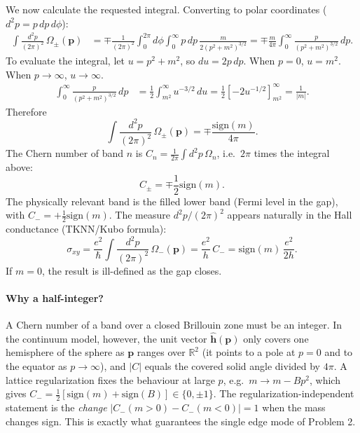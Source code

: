 \documentclass{article}
\begin{document}
    We now calculate the requested integral. Converting to polar coordinates ($d^2p = p \,dp \,d\phi$):
    \begin{align}
        \int \frac{d^2p}{(2\pi)^2}\, \Omega_\pm(\mathbf{p}) &= \mp\frac{1}{(2\pi)^2}\int_0^{2\pi} d\phi \int_0^{\infty} p \,dp \, \frac{m}{2(p^2 + m^2)^{3/2}}
        = \mp\frac{m}{4\pi} \int_0^{\infty} \frac{p}{(p^2 + m^2)^{3/2}} \,dp.
    \end{align}
    To evaluate the integral, let $u = p^2 + m^2$, so $du = 2p \,dp$. When $p=0$, $u=m^2$. When $p\to\infty$, $u\to\infty$.
    \begin{align}
        \int_0^{\infty} \frac{p}{(p^2 + m^2)^{3/2}} \,dp &= \frac{1}{2} \int_{m^2}^{\infty} u^{-3/2} \,du
        = \frac{1}{2} \left[ -2u^{-1/2} \right]_{m^2}^{\infty} = \frac{1}{|m|}.
    \end{align}
    Therefore
    \begin{equation}
        \int \frac{d^2p}{(2\pi)^2}\, \Omega_\pm(\mathbf{p}) = \mp\frac{\mathrm{sign}(m)}{4\pi}.
    \end{equation}
    The Chern number of band $n$ is $C_n = \frac{1}{2\pi}\int d^2p\, \Omega_n$, i.e.\ $2\pi$ times the integral above:
    \begin{equation}
        C_\pm = \mp\frac{1}{2}\mathrm{sign}(m).
    \end{equation}
    The physically relevant band is the filled lower band (Fermi level in the gap), with $C_- = +\frac{1}{2}\mathrm{sign}(m)$. The measure $d^2p/(2\pi)^2$ appears naturally in the Hall conductance (TKNN/Kubo formula):
    \begin{equation}
        \sigma_{xy} = \frac{e^2}{\hbar}\int \frac{d^2p}{(2\pi)^2}\, \Omega_-(\mathbf{p}) = \frac{e^2}{h}\, C_- = \mathrm{sign}(m)\,\frac{e^2}{2h}.
    \end{equation}
    If $m=0$, the result is ill-defined as the gap closes.

    \paragraph{Why a half-integer?} A Chern number of a band over a closed Brillouin zone must be an integer. In the continuum model, however, the unit vector $\hat{\mathbf{h}}(\mathbf{p})$ only covers one hemisphere of the sphere as $\mathbf{p}$ ranges over $\mathbb{R}^2$ (it points to a pole at $p=0$ and to the equator as $p\to\infty$), and $|C|$ equals the covered solid angle divided by $4\pi$. A lattice regularization fixes the behaviour at large $p$, e.g.\ $m \to m - Bp^2$, which gives $C_- = \frac{1}{2}[\mathrm{sign}(m) + \mathrm{sign}(B)] \in \{0, \pm 1\}$. The regularization-independent statement is the \emph{change} $|C_-(m>0) - C_-(m<0)| = 1$ when the mass changes sign. This is exactly what guarantees the single edge mode of Problem 2.
\end{document}
